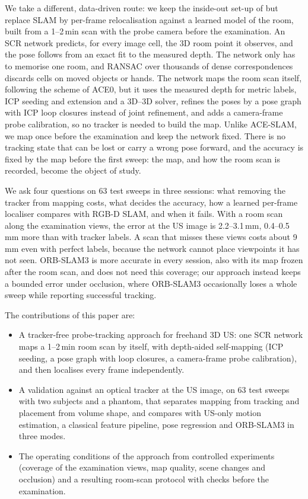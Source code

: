 \documentclass[9pt,shortpaper,twoside,web]{ieeecolor2}
\begin{document}
We take a different, data-driven route: we keep the inside-out set-up of \cite{busam2018insideout} but replace SLAM by per-frame relocalisation against a learned model of the room, built from a 1--2\,min scan with the probe camera before the examination. An SCR network predicts, for every image cell, the 3D room point it observes, and the pose follows from an exact fit to the measured depth. The network only has to memorise one room, and RANSAC over thousands of dense correspondences discards cells on moved objects or hands. The network maps the room scan itself, following the scheme of ACE0, but it uses the measured depth for metric labels, ICP seeding and extension and a 3D--3D solver, refines the poses by a pose graph with ICP loop closures instead of joint refinement, and adds a camera-frame probe calibration, so no tracker is needed to build the map. Unlike ACE-SLAM, we map once before the examination and keep the network fixed. There is no tracking state that can be lost or carry a wrong pose forward, and the accuracy is fixed by the map before the first sweep: the map, and how the room scan is recorded, become the object of study.

We ask four questions on 63 test sweeps in three sessions: what removing the tracker from mapping costs, what decides the accuracy, how a learned per-frame localiser compares with RGB-D SLAM, and when it fails. With a room scan along the examination views, the error at the US image is 2.2--3.1\,mm, 0.4--0.5\,mm more than with tracker labels. A scan that misses these views costs about 9\,mm even with perfect labels, because the network cannot place viewpoints it has not seen. ORB-SLAM3 is more accurate in every session, also with its map frozen after the room scan, and does not need this coverage; our approach instead keeps a bounded error under occlusion, where ORB-SLAM3 occasionally loses a whole sweep while reporting successful tracking.

The contributions of this paper are:
\begin{itemize}
  \item A tracker-free probe-tracking approach for freehand 3D US: one SCR network maps a 1--2\,min room scan by itself, with depth-aided self-mapping (ICP seeding, a pose graph with loop closures, a camera-frame probe calibration), and then localises every frame independently.
  \item A validation against an optical tracker at the US image, on 63 test sweeps with two subjects and a phantom, that separates mapping from tracking and placement from volume shape, and compares with US-only motion estimation, a classical feature pipeline, pose regression and ORB-SLAM3 in three modes.
  \item The operating conditions of the approach from controlled experiments (coverage of the examination views, map quality, scene changes and occlusion) and a resulting room-scan protocol with checks before the examination.
\end{itemize}
\end{document}
